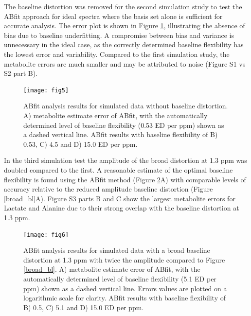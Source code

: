 \documentclass[num-refs]{wiley-article}
\begin{document}
The baseline distortion was removed for the second simulation study to test the ABfit approach for ideal spectra where the basis set alone is sufficient for accurate analysis. The error plot is shown in Figure \ref{flat_bl}, illustrating the absence of bias due to baseline underfitting. A compromise between bias and variance is unnecessary in the ideal case, as the correctly determined baseline flexibility has the lowest error and variability. Compared to the first simulation study, the metabolite errors are much smaller and may be attributed to noise (Figure S1 vs S2 part B).

\begin{figure}
  \begin{center}
    \texttt{[image: fig5]}
    \caption{ABfit analysis results for simulated data without baseline distortion. A) metabolite estimate error of ABfit, with the automatically determined level of baseline flexibility (0.53 ED per ppm) shown as a dashed vertical line. ABfit results with baseline flexibility of B) 0.53, C) 4.5 and D) 15.0 ED per ppm.}
    \label{flat_bl}
  \end{center}
\end{figure}

In the third simulation test the amplitude of the broad distortion at 1.3 ppm was doubled compared to the first. A reasonable estimate of the optimal baseline flexibility is found using the ABfit method (Figure \ref{big_broad_bl}A) with comparable levels of accuracy relative to the reduced amplitude baseline distortion (Figure \ref{broad_bl}A). Figure S3 parts B and C show the largest metabolite errors for Lactate and Alanine due to their strong overlap with the baseline distortion at 1.3 ppm.

\begin{figure}
  \begin{center}
    \texttt{[image: fig6]}
    \caption{ABfit analysis results for simulated data with a broad baseline distortion at 1.3 ppm with twice the amplitude compared to Figure \ref{broad_bl}. A) metabolite estimate error of ABfit, with the automatically determined level of baseline flexibility (5.1 ED per ppm) shown as a dashed vertical line. Errors values are plotted on a logarithmic scale for clarity. ABfit results with baseline flexibility of B) 0.5, C) 5.1 and D) 15.0 ED per ppm.}
    \label{big_broad_bl}
  \end{center}
\end{figure}
\end{document}
